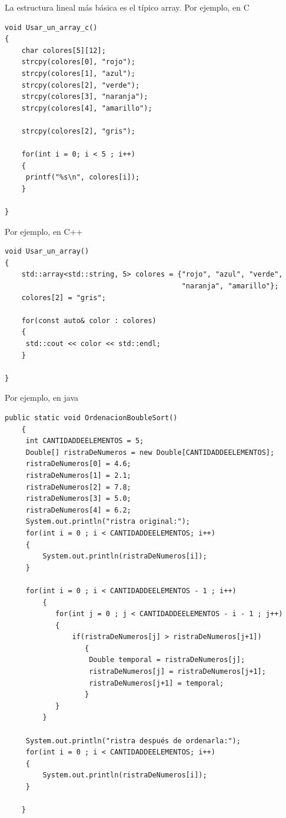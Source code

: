 \documentclass[spanish,12pt,a4paper,final,oneside]{book}
\begin{document}
La estructura lineal más básica es el típico array. Por ejemplo, en C
\begin{lstlisting}[frame=single]
void Usar_un_array_c()
{
    char colores[5][12];
    strcpy(colores[0], "rojo");
    strcpy(colores[1], "azul");
    strcpy(colores[2], "verde");
    strcpy(colores[3], "naranja");
    strcpy(colores[4], "amarillo");

    strcpy(colores[2], "gris");

    for(int i = 0; i < 5 ; i++)
    {
   	 printf("%s\n", colores[i]);
    }

}
\end{lstlisting}
Por ejemplo, en C++
\begin{lstlisting}[frame=single]
void Usar_un_array()
{
    std::array<std::string, 5> colores = {"rojo", "azul", "verde", 
                                          "naranja", "amarillo"};
    colores[2] = "gris";

    for(const auto& color : colores)
    {
   	 std::cout << color << std::endl;
    }

}
\end{lstlisting}
Por ejemplo, en java
\begin{lstlisting}[frame=single]
    public static void OrdenacionBoubleSort()
    {
   	 int CANTIDADDEELEMENTOS = 5;
   	 Double[] ristraDeNumeros = new Double[CANTIDADDEELEMENTOS];
   	 ristraDeNumeros[0] = 4.6;
   	 ristraDeNumeros[1] = 2.1;
   	 ristraDeNumeros[2] = 7.8;
   	 ristraDeNumeros[3] = 5.0;
   	 ristraDeNumeros[4] = 6.2;
   	 System.out.println("ristra original:");
   	 for(int i = 0 ; i < CANTIDADDEELEMENTOS; i++)
   	 {
   	     System.out.println(ristraDeNumeros[i]);
   	 }

   	 for(int i = 0 ; i < CANTIDADDEELEMENTOS - 1 ; i++)
    	 {
            for(int j = 0 ; j < CANTIDADDEELEMENTOS - i - 1 ; j++)
            {
                if(ristraDeNumeros[j] > ristraDeNumeros[j+1])
            	   {
                	Double temporal = ristraDeNumeros[j];
                	ristraDeNumeros[j] = ristraDeNumeros[j+1];
                	ristraDeNumeros[j+1] = temporal;
            	   }
            }
    	 }
   	 
   	 System.out.println("ristra después de ordenarla:");
   	 for(int i = 0 ; i < CANTIDADDEELEMENTOS; i++)
   	 {
   		 System.out.println(ristraDeNumeros[i]);
   	 }
   	 
    }
\end{lstlisting}
\end{document}
